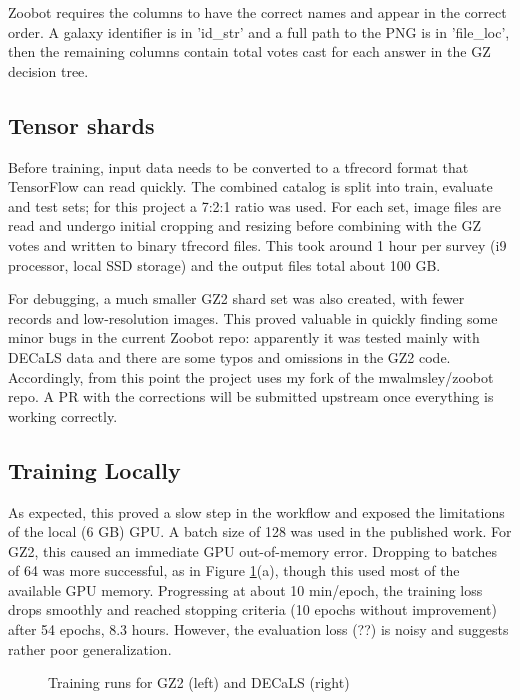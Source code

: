 \documentclass[preprint]{aastex631}
\newcommand{\todo}{\color{red}{TODO}\color{black}\hspace{2mm}}
\begin{document}
Zoobot requires the columns to have the correct names and appear in the correct order. A galaxy identifier is in 'id\_str' and a full path to the PNG is in 'file\_loc', then the remaining columns contain total votes cast for each answer in the GZ decision tree.

\subsection{Tensor shards} \label{shards}

Before training, input data needs to be converted to a tfrecord format that TensorFlow can read quickly. The combined catalog is split into train, evaluate and test sets; for this project a 7:2:1 ratio was used. For each set, image files are read and undergo initial cropping and resizing before combining with the GZ votes and written to binary tfrecord files. This took around 1 hour per survey (i9 processor, local SSD storage) and the output files total about 100 GB.

For debugging, a much smaller GZ2 shard set was also created, with fewer records and low-resolution images. This proved valuable in quickly finding some minor bugs in the current Zoobot repo: apparently it was tested mainly with DECaLS data and there are some typos and omissions in the GZ2 code. Accordingly, from this point the project uses my fork of the mwalmsley/zoobot repo. A PR with the corrections will be submitted upstream once everything is working correctly.

\subsection{Training Locally}

As expected, this proved a slow step in the workflow and exposed the limitations of the local (6 GB) GPU. A batch size of 128 was used in the published work. For GZ2, this caused an immediate GPU out-of-memory error. Dropping to batches of 64 was more successful, as in Figure \ref{fig:train_plots}(a), though this used most of the available GPU memory. Progressing at about 10 min/epoch, the training loss drops smoothly and reached stopping criteria (10 epochs without improvement) after 54 epochs, 8.3 hours. However, the evaluation loss (\todo ??) is noisy and suggests rather poor generalization.


\begin{figure}
	\caption{Training runs for GZ2 (left) and DECaLS (right) \label{fig:train_plots}}
\end{figure}
\end{document}
